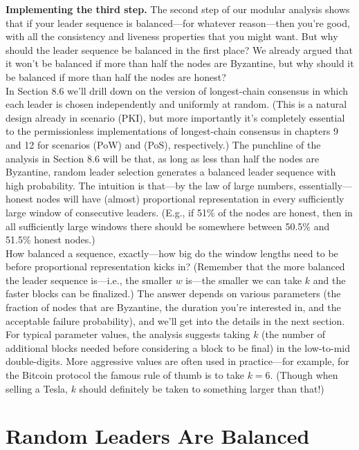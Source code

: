 \noindent
\textbf{Implementing the third step.} The second step of our modular analysis shows that if
your leader sequence is balanced—for whatever reason—then you’re good, with all the consistency and liveness properties that you might want.
But why should the leader sequence be balanced in the first place? We already argued that it
won’t be balanced if more than half the nodes are Byzantine, but why should it be balanced
if more than half the nodes are honest?\\
In Section 8.6 we’ll drill down on the version of longest-chain consensus in which each
leader is chosen independently and uniformly at random. (This is a natural design already
in scenario (PKI), but more importantly it’s completely essential to the permissionless implementations of longest-chain consensus in chapters 9 and 12 for scenarios (PoW) and (PoS),
respectively.) The punchline of the analysis in Section 8.6 will be that, as long as less than half
the nodes are Byzantine, random leader selection generates a balanced leader sequence with
high probability. The intuition is that—by the law of large numbers, essentially—honest
nodes will have (almost) proportional representation in every sufficiently large window of
consecutive leaders. (E.g., if 51\% of the nodes are honest, then in all sufficiently large
windows there should be somewhere between 50.5\% and 51.5\% honest nodes.)\\
How balanced a sequence, exactly—how big do the window lengths need to be before
proportional representation kicks in? (Remember that the more balanced the leader sequence
is—i.e., the smaller $w$ is—the smaller we can take $k$ and the faster blocks can be finalized.)
The answer depends on various parameters (the fraction of nodes that are Byzantine, the
duration you’re interested in, and the acceptable failure probability), and we’ll get into the
details in the next section. For typical parameter values, the analysis suggests taking $k$ (the
number of additional blocks needed before considering a block to be final) in the low-to-mid
double-digits. More aggressive values are often used in practice—for example, for the Bitcoin protocol the famous rule of thumb is to take $k = 6$. (Though when selling a Tesla, $k$ should definitely be taken to something larger than that!)

\section{Random Leaders Are Balanced}

